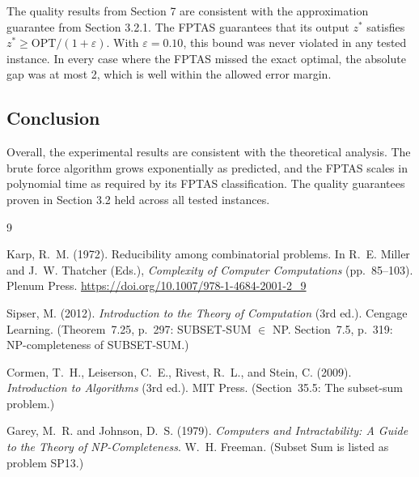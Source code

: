 \documentclass[12pt,a4paper]{article}
\theoremstyle{definition}
\begin{document}
The quality results from Section 7 are consistent with the approximation guarantee from Section 3.2.1. The FPTAS guarantees that its output $z^*$ satisfies $z^* \ge \mathrm{OPT}/(1+\varepsilon)$. With $\varepsilon = 0.10$, this bound was never violated in any tested instance. In every case where the FPTAS missed the exact optimal, the absolute gap was at most 2, which is well within the allowed error margin.

\subsection{Conclusion}

Overall, the experimental results are consistent with the theoretical analysis. The brute force algorithm grows exponentially as predicted, and the FPTAS scales in polynomial time as required by its FPTAS classification. The quality guarantees proven in Section 3.2 held across all tested instances.


\newpage
\begin{thebibliography}{9}

  Karp, R.~M. (1972).
  Reducibility among combinatorial problems.
  In R.~E. Miller and J.~W. Thatcher (Eds.),
  \textit{Complexity of Computer Computations} (pp.~85--103). Plenum Press.
  \url{https://doi.org/10.1007/978-1-4684-2001-2_9}

  Sipser, M. (2012).
  \textit{Introduction to the Theory of Computation} (3rd ed.).
  Cengage Learning.
  (Theorem~7.25, p.~297: SUBSET-SUM $\in$ NP.
   Section~7.5, p.~319: NP-completeness of SUBSET-SUM.)

  Cormen, T.~H., Leiserson, C.~E., Rivest, R.~L., and Stein, C. (2009).
  \textit{Introduction to Algorithms} (3rd ed.). MIT Press.
  (Section~35.5: The subset-sum problem.)

  Garey, M.~R. and Johnson, D.~S. (1979).
  \textit{Computers and Intractability: A Guide to the Theory of
  NP-Completeness}. W.~H. Freeman.
  (Subset Sum is listed as problem SP13.)

\end{thebibliography}
\end{document}
